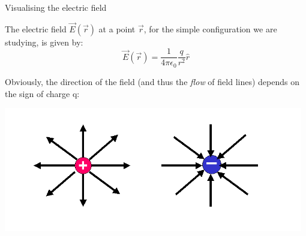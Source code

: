 \begin{frame}{Visualising the electric field}

The electric field $\vec{E}(\vec{r})$ at a point $\vec{r}$, for the simple configuration
we are studying, is given by:
\begin{equation*}
   \vec{E}(\vec{r}) = \frac{1}{4\pi\epsilon_0} \frac{q}{r^2} \hat{r}
\end{equation*}

\vspace{0.2cm}

Obviously, the direction of the field (and thus the {\em flow} of field lines) depends
on the sign of charge q:\\

\vspace{0.2cm}

\begin{center}
  \includegraphics[width=0.98\textwidth]{./images/schematics/electric_field_lines_pos_and_neg_point_charges.png}\\
\end{center}

\end{frame}


%
%
%

